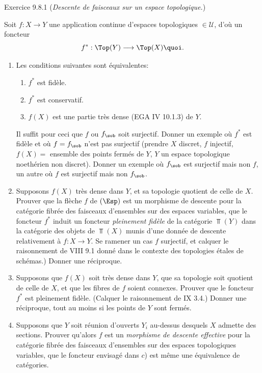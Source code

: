 \begin{enonce*}[remark]{Exercice 9.8.1}
(\emph{Descente de faisceaux sur un espace topologique.})

Soit $f:X\rightarrow Y$ une application continue d'espaces
topologiques $\in 𝒰$, d'où un foncteur
$$
f^{\ast}:\Top(Y)\longrightarrow \Top(X){\quoi}.
$$
\begin{enumerate}
\renewcommand{\theenumi}{\alph{enumi}}
\renewcommand{\labelenumi}{\theenumi)}
\item Les conditions suivantes sont équivalentes:
\begin{enumerate}
\renewcommand{\theenumii}{\roman{enumii}}
\renewcommand{\labelenumii}{(\theenumii)}
\item $f^{\ast}$ est fidèle.

\item $f^{\ast}$ est conservatif.

\item $f(X)$ est une partie très dense (EGA IV 10.1.3) de $Y$.
\end{enumerate}
Il suffit pour ceci que $f$ ou $f_{\sob}$ soit surjectif. Donner un
exemple où $f^{\ast}$ est fidèle et où $f=f_{\sob}$ n'est pas
surjectif (prendre $X$ discret, $f$ injectif, $f(X)=$ ensemble des
points fermés de $Y$, $Y$ un espace topologique noethérien non
discret). Donner un exemple où $f_{\sob}$ est surjectif mais non
$f$, un autre où $f$ est surjectif mais non $f_{\sob}$.

\item Supposons $f(X)$ très dense dans $Y$, et sa topologie quotient
de celle de $X$. Prouver que la flèche $f$ de $(\Esp)$ est un
morphisme de descente pour la catégorie fibrée des faisceaux
d'ensembles sur des espaces variables, \ie que le foncteur
$f^{\ast}$ induit un foncteur \emph{pleinement fidèle}\pageoriginale
de la catégorie $\Top(Y)$ dans la catégorie des objets de $\Top(X)$
munis d'une donnée de descente relativement à $f:X\rightarrow Y$. Se
ramener un cas $f$ surjectif, et calquer le raisonnement de VIII 9.1
donné dans le contexte des topologies étales de schémas.) Donner une
réciproque.

\item Supposons que $f(X)$ soit très dense dans $Y$, que sa topologie
soit quotient de celle de $X$, et que les fibres de $f$ soient
connexes. Prouver que le foncteur $f^{\ast}$ est pleinement fidèle.
(Calquer le raisonnement de  IX 3.4.) Donner une réciproque,
tout au moins si les points de $Y$ sont fermés.

\item Supposons que $Y$ soit réunion d'ouverts $Y_i$ au-dessus
desquels $X$ admette des sections. Prouver qu'alors $f$ est un
\emph{morphisme de descente effective} pour la catégorie fibrée des
faisceaux d'ensembles sur des espaces topologiques variables, \ie
que le foncteur envisagé dans $c$) est même une équivalence de
catégories.
\end{enumerate}
\end{enonce*}

